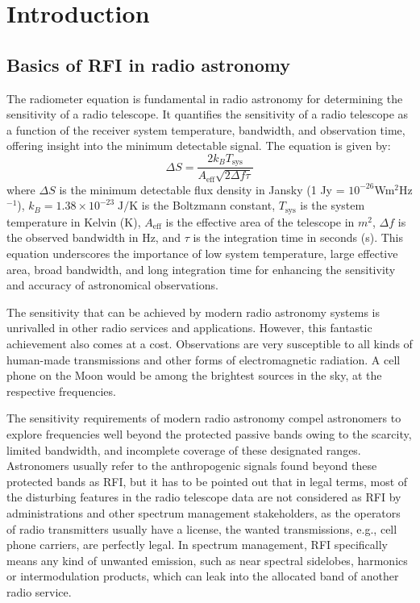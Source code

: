 \section{Introduction}
\label{section:hardware: introduction}


\subsection{Basics of RFI in radio astronomy}
The radiometer equation is fundamental in radio astronomy for determining the sensitivity of a radio telescope. It quantifies the sensitivity of a radio telescope as a function of the receiver system temperature, bandwidth, and observation time, offering insight into the minimum detectable signal. The equation is given by:
\[ \Delta S = \frac{2 k_B T_{\text{sys}}}{A_{\text{eff}} \sqrt{2 \Delta f \tau}} \]
where \( \Delta S \) is the minimum detectable flux density in Jansky (1 Jy = $10^{-26}$Wm$^2$Hz$^{-1}$), \( k_B =1.38 \times 10^{-23} \;\text{J} / \text{K}\) is the Boltzmann constant, \( T_{\text{sys}} \) is the system temperature in Kelvin (K), \( A_{\text{eff}} \) is the effective area of the telescope in $m^2$, \( \Delta f \) is the observed bandwidth in Hz, and \( \tau \) is the integration time in seconds (s). This equation underscores the importance of low system temperature, large effective area, broad bandwidth, and long integration time for enhancing the sensitivity and accuracy of astronomical observations.

The sensitivity that can be achieved by modern radio astronomy systems is unrivalled in other radio services and applications. However, this fantastic achievement also comes at a cost. Observations are very susceptible to all kinds of human-made transmissions and other forms of electromagnetic radiation. A cell phone on the Moon would be among the brightest sources in the sky, at the respective frequencies. 

The sensitivity requirements of modern radio astronomy compel astronomers to explore frequencies well beyond the protected passive bands owing to the scarcity, limited bandwidth, and incomplete coverage of these designated ranges. Astronomers usually refer to the anthropogenic signals found beyond these protected bands as RFI, but it has to be pointed out that in legal terms, most of the disturbing features in the radio telescope data are not considered as RFI by administrations and other spectrum management stakeholders, as the operators of radio transmitters usually have a license, the wanted transmissions, e.g., cell phone carriers, are perfectly legal. In spectrum management, RFI specifically means any kind of unwanted emission, such as near spectral sidelobes, harmonics or intermodulation products, which can leak into the allocated band of another radio service.

